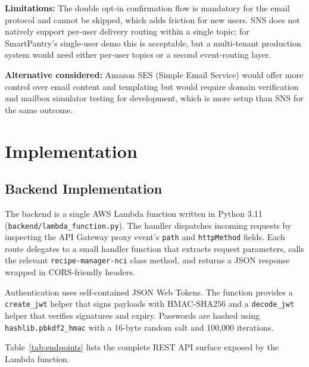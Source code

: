 \documentclass[conference]{IEEEtran}
\begin{document}
\textbf{Limitations:} The double opt-in confirmation flow is mandatory for the email protocol and cannot be skipped, which adds friction for new users. SNS does not natively support per-user delivery routing within a single topic; for SmartPantry's single-user demo this is acceptable, but a multi-tenant production system would need either per-user topics or a second event-routing layer.

\textbf{Alternative considered:} Amazon SES (Simple Email Service) would offer more control over email content and templating but would require domain verification and mailbox simulator testing for development, which is more setup than SNS for the same outcome.

\section{Implementation}

\subsection{Backend Implementation}

The backend is a single AWS Lambda function written in Python 3.11 (\texttt{backend/lambda\_function.py}). The handler dispatches incoming requests by inspecting the API Gateway proxy event's \texttt{path} and \texttt{httpMethod} fields. Each route delegates to a small handler function that extracts request parameters, calls the relevant \texttt{recipe-manager-nci} class method, and returns a JSON response wrapped in CORS-friendly headers.

Authentication uses self-contained JSON Web Tokens. The function provides a \texttt{create\_jwt} helper that signs payloads with HMAC-SHA256 and a \texttt{decode\_jwt} helper that verifies signatures and expiry. Passwords are hashed using \texttt{hashlib.pbkdf2\_hmac} with a 16-byte random salt and 100{,}000 iterations.

Table~\ref{tab:endpoints} lists the complete REST API surface exposed by the Lambda function.
\end{document}
